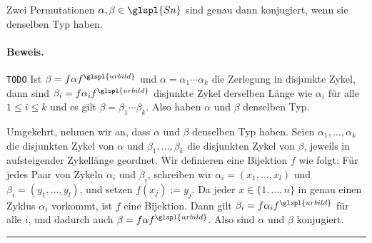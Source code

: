 \documentclass[9pt]{article}
\begin{document}
\begin{satz}
Zwei Permutationen $\alpha, \beta \in \glspl{Sn}$ sind genau dann konjugiert, wenn sie denselben Typ haben.

\paragraph{Beweis.}\texttt{TODO} Ist $\beta = f \alpha f^{\glspl{urbild}}$ und $\alpha = \alpha_1 \cdots \alpha_k$ die Zerlegung in disjunkte Zykel, dann sind $\beta_i = f \alpha_i f^{\glspl{urbild}}$ disjunkte Zykel derselben Länge wie $\alpha_i$ für alle $1 \leq i \leq k$ und es gilt $\beta = \beta_1 \cdots \beta_k$. Also haben $\alpha$ und $\beta$ denselben Typ.  

Umgekehrt, nehmen wir an, dass $\alpha$ und $\beta$ denselben Typ haben. Seien $\alpha_1, \dots, \alpha_k$ die disjunkten Zykel von $\alpha$ und $\beta_1, \dots, \beta_k$ die disjunkten Zykel von $\beta$, jeweils in aufsteigender Zykellänge geordnet. Wir definieren eine Bijektion $f$ wie folgt:  
Für jedes Paar von Zykeln $\alpha_i$ und $\beta_i$, schreiben wir $\alpha_i = (x_1, \dots, x_l)$ und $\beta_i = (y_1, \dots, y_l)$, und setzen $f(x_j) := y_j$. Da jeder $x \in \{1, \dots, n\}$ in genau einen Zyklus $\alpha_i$ vorkommt, ist $f$ eine Bijektion. Dann gilt $\beta_i = f \alpha_i f^{\glspl{urbild}}$ für alle $i$, und dadurch auch $\beta = f \alpha f^{\glspl{urbild}}$. Also sind $\alpha$ und $\beta$ konjugiert.
 \end{satz} \noindent \rule{8cm}{0.4pt}
\end{document}
